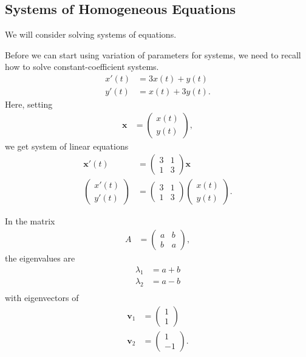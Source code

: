 \documentclass[10pt]{mypackage}
\begin{document}
\subsection{Systems of Homogeneous Equations}%
We will consider solving systems of equations.
\begin{example}
  Before we can start using variation of parameters for systems, we need to recall how to solve constant-coefficient systems.
  \begin{align*}
    x'(t) &= 3x(t) + y(t)\\
    y'(t) &= x(t) + 3y(t).
  \end{align*}
  Here, setting
  \begin{align*}
    \mathbf{x} &= \begin{pmatrix}x(t)\\y(t)\end{pmatrix},
  \end{align*}
  we get system of linear equations
  \begin{align*}
    \mathbf{x}'(t) &= \begin{pmatrix}3 & 1 \\ 1 & 3\end{pmatrix} \mathbf{x}\\
    \begin{pmatrix}x'(t) \\y'(t)\end{pmatrix} &= \begin{pmatrix}3& 1\\1&3\end{pmatrix} \begin{pmatrix}x(t)\\y(t)\end{pmatrix}.
  \end{align*}

\end{example}
\begin{remark}
In the matrix
\begin{align*}
  A &= \begin{pmatrix}a & b \\ b & a\end{pmatrix},
\end{align*}
the eigenvalues are 
\begin{align*}
  \lambda_1 &= a + b\\
  \lambda_2 &= a-b\\
  \end{align*}
  with eigenvectors of
  \begin{align*}
  \mathbf{v}_1 &= \begin{pmatrix}1\\1\end{pmatrix}\\
  \mathbf{v}_2 &= \begin{pmatrix}1\\-1\end{pmatrix}.
\end{align*}
\end{remark}
\end{document}
